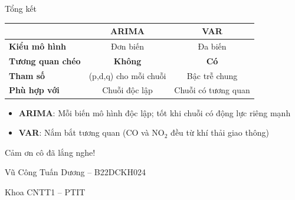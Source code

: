\documentclass[serif, aspectratio=169]{beamer}
\newcommand{\highlight}[1]{\textbf{\color{hkustblue}#1}}
\newcommand{\red}[1]{\textbf{\color{hkustred}#1}}
\newcommand{\green}[1]{\textbf{\color{codegreen}#1}}
\begin{document}
\begin{frame}{Tổng kết}
    \begin{center}
        \begin{tabular}{|l|c|c|}
            \hline
            & \textbf{ARIMA} & \textbf{VAR} \\ \hline
            \textbf{Kiểu mô hình} & Đơn biến & Đa biến \\ \hline
            \textbf{Tương quan chéo} & \red{Không} & \green{Có} \\ \hline
            \textbf{Tham số} & (p,d,q) cho mỗi chuỗi & Bậc trễ chung \\ \hline
            \textbf{Phù hợp với} & Chuỗi độc lập & Chuỗi có tương quan \\ \hline
        \end{tabular}
    \end{center}
    
    \vspace{0.5cm}
    \begin{itemize}
        \item \highlight{ARIMA}: Mỗi biến mô hình độc lập; tốt khi chuỗi có động lực riêng mạnh
        \item \highlight{VAR}: Nắm bắt tương quan (CO và NO$_2$ đều từ khí thải giao thông)
    \end{itemize}
\end{frame}

\begin{frame}
    \begin{center}
        \vspace{1cm}
        {\Huge \color{hkustred} Cảm ơn cô đã lắng nghe!}
        
        \vspace{1cm}
        \Large Vũ Công Tuấn Dương -- B22DCKH024
        
        \normalsize Khoa CNTT1 -- PTIT
    \end{center}
\end{frame}
\end{document}
